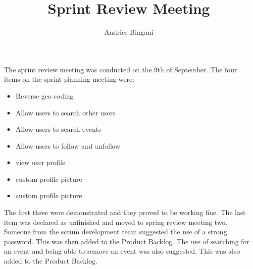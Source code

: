 \documentclass[10pt,a4paper]{article}
\author{Andries Bingani}
\title{Sprint Review Meeting}
\begin{document}
\maketitle

The sprint review meeting was conducted on the 9th of September. The four items on the sprint planning meeting were: \\
\begin{itemize}
\item Reverse geo coding
\item Allow users to search other users
\item Allow users to search events
\item Allow users to follow and unfollow
\item view user profile
\item custom profile picture
\item custom profile picture
\end{itemize}

The first three were demonstrated and they proved to be working fine. The last item was declared as unfinished and moved to spring review meeting two.
\\
Someone from the scrum development team suggested the use of a strong password. This was then added to the Product Backlog. The use of searching for an event and being able to remove an event was also suggested. This was also added to the Product Backlog. 
\end{document}
